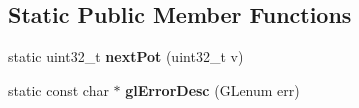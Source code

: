 \subsection*{Static Public Member Functions}
\begin{DoxyCompactItemize}
\item 
\hypertarget{struct_tempest_1_1_opengl2x_1_1_device_a21a551c129eff2f65cdbd84a423a4c4d}{static uint32\+\_\+t {\bfseries next\+Pot} (uint32\+\_\+t v)}\label{struct_tempest_1_1_opengl2x_1_1_device_a21a551c129eff2f65cdbd84a423a4c4d}

\item 
\hypertarget{struct_tempest_1_1_opengl2x_1_1_device_a53e5369c2e385cb479a422781fbdd97e}{static const char $\ast$ {\bfseries gl\+Error\+Desc} (G\+Lenum err)}\label{struct_tempest_1_1_opengl2x_1_1_device_a53e5369c2e385cb479a422781fbdd97e}

\end{DoxyCompactItemize}
